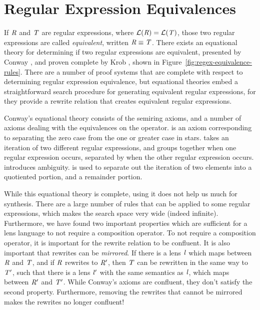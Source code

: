 \documentclass[numbers,10pt,preprint\ifanon ,nocopyrightspace\fi]{sigplanconf}
\begin{document}
\section{Regular Expression Equivalences}

If $\mathit{R}$ and $\mathit{T}$ are regular expressions, where
$\mathcal{L}(\mathit{R})=\mathcal{L}(\mathit{T})$, those two regular expressions
are called \textit{equivalent}, written $\mathit{R}\equiv\mathit{T}$.
There exists an equational theory for determining if two regular expressions
are equivalent, presented by Conway \cite{conway}, and proven complete by Krob
\cite{Krob}, shown in Figure~\ref{fig:regex-equivalence-rules}.
There are a number of proof systems that are complete with respect to
determining regular
expression equivalence, but equational theories embed a straightforward search
procedure for generating equivalent regular expressions, for they provide a
rewrite relation that creates equivalent regular expressions.

Conway's equational
theory consists of the semiring axioms, and a number of axioms dealing with the
equivalences on the \StarRegexType{} operator.
\ProductstarRule{} is an axiom corresponding to separating the
zero case from the one or greater case in stars.
\SumstarRule{} takes an iteration of two
different regular expressions, and groups together when one regular expression occurs,
separated by when the other regular expression occurs.  \StarstarRule{}
introduces ambiguity.  \DicyclicityRule{} is used to separate out the iteration
of two elements into a quotiented portion, and a remainder portion.

While this equational theory is complete, using it does not help us much for
synthesis.  There are a large number of rules that can be
applied to some regular expressions,
which makes the search space very wide (indeed infinite).
Furthermore, we have found two important properties which are sufficient for a
lens language to not require a composition operator.
To not require a composition operator, it is important for the rewrite relation
to be confluent.  It is also important that rewrites can be \emph{mirrored}.
If there is a lens $\mathit{l}$ which maps between $\mathit{R}$ and $\mathit{T}$,
and if $\mathit{R}$ rewrites to
$\mathit{R}'$, then $\mathit{T}$ can be rewritten in the same way to $\mathit{T}'$,
such that there is
a lens $\mathit{l}'$ with the same semantics as $\mathit{l}$, which maps between
$\mathit{R}'$ and $\mathit{T}'$.  While Conway's axioms are confluent, they don't
satisfy the second property.
Furthermore, removing the rewrites that cannot be mirrored makes
the rewrites no longer confluent!
\end{document}
